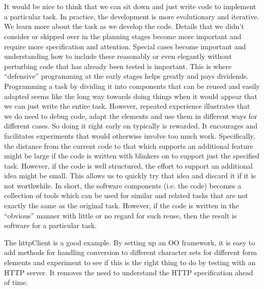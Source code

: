 \section{}
It would be nice to think that we can sit down and just write code to
implement a particular task.  In practice, the development is more
evolutionary and iterative. We learn more about the task as we develop
the code.  Details that we didn't consider or skipped over in the
planning stages become more important and require more specification
and attention.  Special cases become important and understanding how
to include these reasonably or even elegantly without perturbing code
that has already been tested is important.  This is where
``defensive'' programming at the early stages helps greatly and pays
dividends.  Programming a task by dividing it into components that can
be reused and easily adapted seems like the long way towards doing
things when it would appear that we can just write the entire task.
However, repeated experience illustrates that we do need to debug
code, adapt the elements and use them in different ways for different
cases.  So doing it right early on typically is rewarded.  It
encourages and facilitates experiments that would otherwise involve
too much work.  Specifically, the distance from the current code to
that which supports an additional feature might be large if the code
is written with blinkers on to support just the specified task.
However, if the code is well structured, the effort to support an
additional idea might be small. This allows us to quickly try that
idea and discard it if it is not worthwhile.  In short, the software
components (i.e. the code) becomes a collection of tools which can be
used for similar and related tasks that are not exactly the same as
the original task.
However, if the code is written in the ``obvious'' manner
with little or no regard for such reuse, then
the result is software for a particular task.

The httpClient is a good example. By setting up an OO framework, it is
easy to add methods for handling conversion to different character
sets for different form elements and experiment to see if this is the
right thing to do by testing with an HTTP server.
It removes the need to understand the HTTP specification ahead of
time.




\begin{bibunit}
\nocite{*}
\end{bibunit}
%


